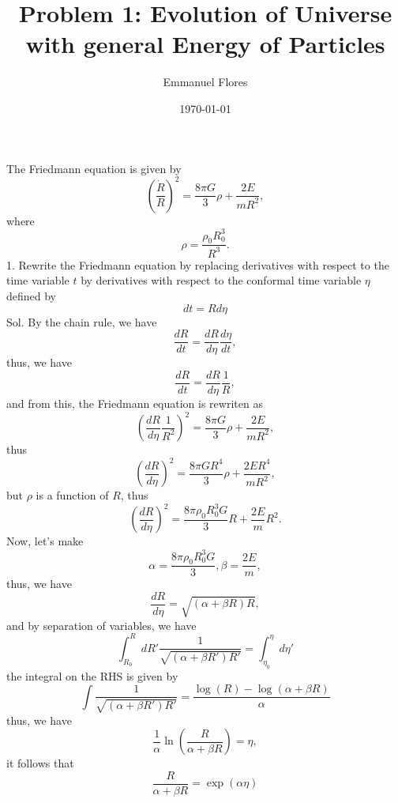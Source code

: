 \documentclass[11pt]{article}
\title{Problem 1: Evolution of Universe with general Energy of Particles}
\author{Emmanuel Flores}
\date{\today}
\begin{document}
\maketitle
The Friedmann equation is given by 
\begin{displaymath}
  \left( \frac{\dot{R}}{R}\right)^2 = \frac{8\pi G}{3}\rho +\frac{2E}{mR^2},
\end{displaymath}
where \begin{displaymath}
  \rho = \frac{\rho_0 R_0^3}{R^3}.
\end{displaymath}
1. Rewrite the Friedmann equation by replacing derivatives with respect to the time variable $t$ by derivatives with respect to the conformal time variable $\eta$ defined by
\begin{displaymath}
  dt = Rd\eta
\end{displaymath}
Sol.
By the chain rule, we have
\begin{displaymath}
  \frac{dR}{dt} = \frac{dR}{d\eta}\frac{d\eta}{dt},
\end{displaymath}
thus, we have 
\begin{displaymath}
  \frac{dR}{dt} = \frac{dR}{d\eta}\frac{1}{R},
\end{displaymath}
and from this, the Friedmann equation is rewriten as
\begin{displaymath}
  \left( \frac{dR}{d\eta}\frac{1}{R^2}\right)^2 = \frac{8\pi G}{3}\rho +\frac{2E}{mR^2},
\end{displaymath}
thus
\begin{displaymath}
  \left( \frac{dR}{d\eta}\right)^2 = \frac{8\pi GR^4}{3}\rho +\frac{2ER^4}{mR^2},
\end{displaymath}
but $\rho$ is a function of $R$, thus
\begin{displaymath}
  \left( \frac{dR}{d\eta}\right)^2 = \frac{8\pi \rho_0 R_0^3G}{3}R +\frac{2E}{m}R^2.
\end{displaymath}
Now, let's make 
\begin{displaymath}
  \alpha = \frac{8\pi \rho_0 R_0^3G}{3}, \beta = \frac{2E}{m},
\end{displaymath}
thus, we have
\begin{displaymath}
  \frac{dR}{d\eta} = \sqrt{(\alpha+\beta R)R},
\end{displaymath}
and by separation of variables, we have
\begin{displaymath}
  \int_{R_0}^{R} dR' \frac{1}{\sqrt{(\alpha+\beta R')R'}} = \int_{\eta_0}^{\eta} d\eta' 
\end{displaymath}
the integral on the RHS is given by
\begin{displaymath}
  \int \frac{1}{\sqrt{(\alpha+\beta R')R'}} = \frac{\log (R)-\log (\alpha+\beta R)}{\alpha}
  \end{displaymath}
thus, we have 
\begin{displaymath}
  \frac{1}{\alpha} \ln \left(\frac{R}{\alpha+\beta R}\right)=\eta,
\end{displaymath}
it follows that
\begin{displaymath}
  \frac{R}{\alpha+\beta R}=\exp(\alpha\eta)
\end{displaymath}
\end{document}

